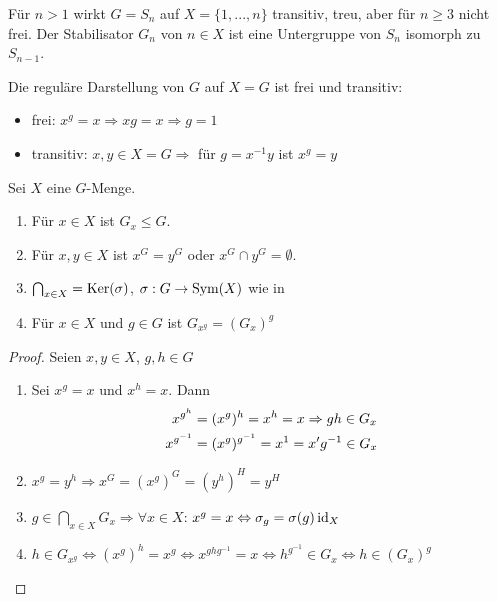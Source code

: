 \begin{example}
	Für $n>1$ wirkt $G=S_n$ auf $X=\{1,...,n\}$ transitiv, treu, aber für $n\ge 3$ nicht frei. Der Stabilisator $G_n$ von $n\in X$ ist eine Untergruppe von $S_n$ isomorph zu $S_{n-1}$.
\end{example}

\begin{example}
	Die reguläre Darstellung von $G$ auf $X=G$ ist frei und transitiv:
	\begin{itemize}
		\item frei: $x^g=x\Rightarrow xg=x\Rightarrow g=1$
		\item transitiv: $x,y\in X=G\Rightarrow$ für $g=x^{-1}y$ ist $x^g=y$
	\end{itemize}
\end{example}

\begin{lemma}
	Sei $X$ eine $G$-Menge.
	\begin{enumerate}[label=(\alph*)]
		\item Für $x\in X$ ist $G_x\le G$.
		\item Für $x,y\in X$ ist $x^G=y^G$ oder $x^G\cap y^G=\emptyset$.
		\item $\bigcap_{x\in X}=\operatorname{Ker}(\sigma)$, $\sigma:G\to\operatorname{Sym}(X)$ wie in 
		\item Für $x\in X$ und $g\in G$ ist $G_{x^g}=(G_x)^g$
	\end{enumerate}
\end{lemma}
\begin{proof}
	Seien $x,y\in X$, $g,h\in G$
	\begin{enumerate}[label=(\alph*)]
		\item Sei $x^g=x$ und $x^h=x$. Dann
		\begin{align}
			x^{g^h}&=(x^g)^h=x^h=x\Rightarrow gh\in G_x \notag \\
			x^{g^{-1}} &= (x^g)^{g^{-1}} = x^1 = x\RightTorque g^{-1}\in G_x \notag
		\end{align}
		\item $x^g=y^h\Rightarrow x^G=(x^g)^G=(y^h)^H=y^H$
		\item $g\in\bigcap_{x\in X} G_x\Rightarrow\forall x\in X$: $x^g=x\Leftrightarrow \sigma_g=\sigma(g)\operatorname{id}_X$
		\item $h\in G_{x^g}\Leftrightarrow (x^g)^h=x^g\Leftrightarrow x^{ghg^{-1}}=x\Leftrightarrow h^{g^{-1}}\in G_x\Leftrightarrow h\in (G_x)^g$
	\end{enumerate}
\end{proof}

